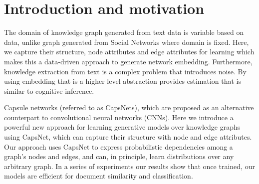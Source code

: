 \section{Introduction and motivation}
\label{sec:introduction}
The domain of knowledge graph generated from text data is variable based on data, unlike graph generated from Social Networks where domain is fixed. Here, we capture their structure, node attributes and edge attributes for learning which makes this a data-driven approach to generate network embedding. Furthermore, knowledge extraction from text is a complex problem that introduces noise. By using embedding that is a higher level abstraction provides estimation that is similar to cognitive inference. 

Capsule networks (referred to as CapsNets), which are proposed as an alternative counterpart to convolutional neural networks (CNNs). Here we introduce a powerful new approach for learning generative models over knowledge graphs using CapsNet, which can capture their structure with node and edge attributes. Our approach uses CapsNet to express probabilistic dependencies among a graph's nodes and edges, and can, in principle, learn distributions over any arbitrary graph. In a series of experiments our results show that once trained, our models are efficient for document similarity and classification.
